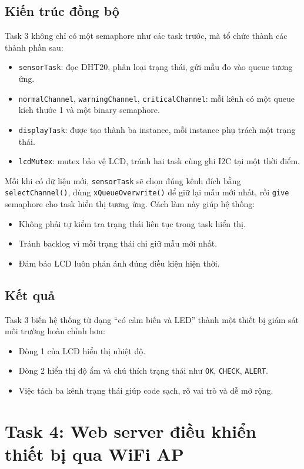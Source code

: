 \documentclass[12pt,a4paper]{article}
\begin{document}
\subsection{Kiến trúc đồng bộ}

Task 3 không chỉ có một semaphore như các task trước, mà tổ chức thành các thành phần sau:
\begin{itemize}
  \item \texttt{sensorTask}: đọc DHT20, phân loại trạng thái, gửi mẫu đo vào queue tương ứng.
  \item \texttt{normalChannel}, \texttt{warningChannel}, \texttt{criticalChannel}: mỗi kênh có một queue kích thước 1 và một binary semaphore.
  \item \texttt{displayTask}: được tạo thành ba instance, mỗi instance phụ trách một trạng thái.
  \item \texttt{lcdMutex}: mutex bảo vệ LCD, tránh hai task cùng ghi I2C tại một thời điểm.
\end{itemize}

Mỗi khi có dữ liệu mới, \texttt{sensorTask} sẽ chọn đúng kênh đích bằng \texttt{selectChannel()}, dùng \texttt{xQueueOverwrite()} để giữ lại mẫu mới nhất, rồi \texttt{give} semaphore cho task hiển thị tương ứng. Cách làm này giúp hệ thống:
\begin{itemize}
  \item Không phải tự kiểm tra trạng thái liên tục trong task hiển thị.
  \item Tránh backlog vì mỗi trạng thái chỉ giữ mẫu mới nhất.
  \item Đảm bảo LCD luôn phản ánh đúng điều kiện hiện thời.
\end{itemize}

\subsection{Kết quả}

Task 3 biến hệ thống từ dạng ``có cảm biến và LED'' thành một thiết bị giám sát môi trường hoàn chỉnh hơn:
\begin{itemize}
  \item Dòng 1 của LCD hiển thị nhiệt độ.
  \item Dòng 2 hiển thị độ ẩm và chú thích trạng thái như \texttt{OK}, \texttt{CHECK}, \texttt{ALERT}.
  \item Việc tách ba kênh trạng thái giúp code sạch, rõ vai trò và dễ mở rộng.
\end{itemize}

\section{Task 4: Web server điều khiển thiết bị qua WiFi AP}
\end{document}
